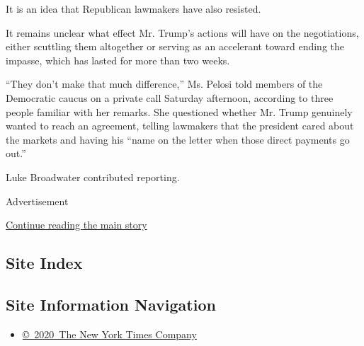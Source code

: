 It is an idea that Republican lawmakers have also resisted.

It remains unclear what effect Mr. Trump's actions will have on the
negotiations, either scuttling them altogether or serving as an
accelerant toward ending the impasse, which has lasted for more than two
weeks.

``They don't make that much difference,'' Ms. Pelosi told members of the
Democratic caucus on a private call Saturday afternoon, according to
three people familiar with her remarks. She questioned whether Mr. Trump
genuinely wanted to reach an agreement, telling lawmakers that the
president cared about the markets and having his ``name on the letter
when those direct payments go out.''

Luke Broadwater contributed reporting.

Advertisement

\protect\hyperlink{after-bottom}{Continue reading the main story}

\hypertarget{site-index}{%
\subsection{Site Index}\label{site-index}}

\hypertarget{site-information-navigation}{%
\subsection{Site Information
Navigation}\label{site-information-navigation}}

\begin{itemize}
\tightlist
\item
  \href{https://help.nytimes.com/hc/en-us/articles/115014792127-Copyright-notice}{©~2020~The
  New York Times Company}
\end{itemize}

